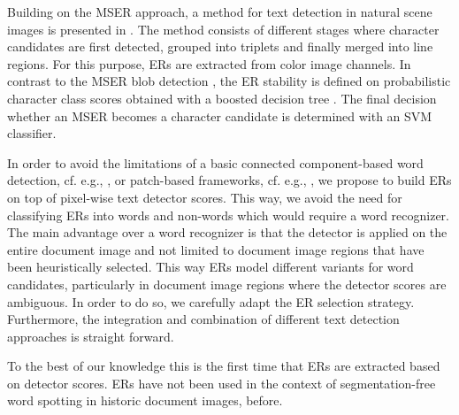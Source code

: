 Building on the MSER approach, a method for text detection in natural scene images is presented
in \cite{Neumann16}. The method consists of different stages where character candidates are
first detected, grouped into triplets and finally merged into line regions.
For this purpose, ERs are extracted from color image channels.
In contrast to the MSER blob detection \cite{Matas04}, the ER stability is
defined on probabilistic character class scores obtained with a boosted decision tree \cite{Neumann16}. 
The final decision whether an MSER becomes a character candidate is determined with an SVM classifier.

In order to avoid the limitations of a basic connected component-based word detection, cf.
e.g., \cite{Kovalchuk14}, or patch-based frameworks, cf. e.g., \cite{Almazan14a}, we propose
to build ERs on top of pixel-wise text detector scores.
This way, we avoid the need for classifying ERs into words and non-words which would require a word recognizer.
The main advantage over a word recognizer is that the detector is applied on the entire
document image and not limited to document image regions that have been heuristically selected. 
This way ERs model different variants for word candidates, particularly in document image
regions where the detector scores are ambiguous. In order to do so, we carefully adapt the ER
selection strategy. Furthermore, the integration and combination of different 
text detection approaches is straight forward. 

To the best of our knowledge this is the first time that
ERs are extracted based on detector scores. ERs have not been used in the context of
segmentation-free word spotting in historic document images, before.


